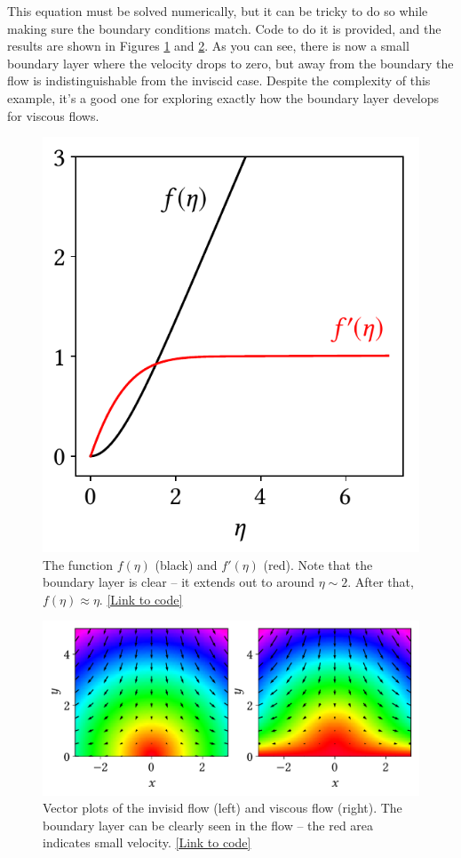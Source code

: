 This equation must be solved numerically, but it can be tricky to do so while making sure the boundary conditions match.  Code to do it is provided, and the results are shown in Figures \ref{fig_boundary_result1} and \ref{fig_boundary_result2}.  As you can see, there is now a small boundary layer where the velocity drops to zero, but away from the boundary the flow is indistinguishable from the inviscid case.  Despite the complexity of this example, it's a good one for exploring exactly how the boundary layer develops for viscous flows.

\begin{figure}
\centering
\includegraphics[width=0.4\linewidth]{Figures/Chapter2/fig_boundary_result1}
\caption{The function $f(\eta)$ (black) and $f'(\eta)$ (red).  Note that the boundary layer is clear -- it extends out to around $\eta \sim 2$.  After that, $f(\eta) \approx \eta$.  \href{https://nbviewer.jupyter.org/github/josephmacmillan/IntroFluidDynamics/blob/master/Jupyter/2-ViscousFluids.ipynb\#Figures-2.16:-Boundary-layers}{[Link to code]}}
\label{fig_boundary_result1}
\end{figure}

\begin{figure}
\centering
\includegraphics[width=0.9\linewidth]{Figures/Chapter2/fig_boundary_result2}
\caption{Vector plots of the invisid flow (left) and viscous flow (right).  The boundary layer can be clearly seen in the flow -- the red area indicates small velocity. \href{https://nbviewer.jupyter.org/github/josephmacmillan/IntroFluidDynamics/blob/master/Jupyter/2-ViscousFluids.ipynb\#Figure-2.17:-Boundary-Layers}{[Link to code]} }
\label{fig_boundary_result2}
\end{figure}


